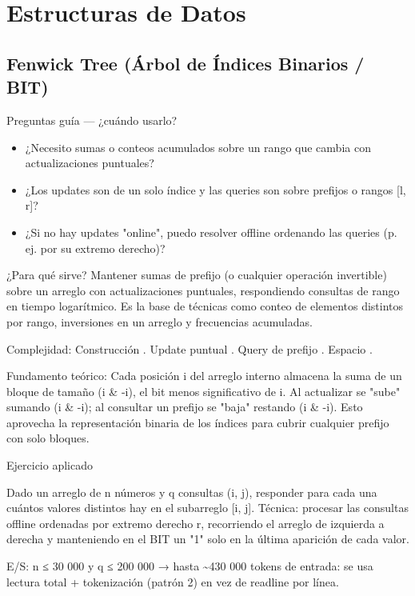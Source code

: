 \section{Estructuras de Datos}

\subsection{Fenwick Tree (Árbol de Índices Binarios / BIT)}

Preguntas guía — ¿cuándo usarlo?

\begin{itemize}
\item ¿Necesito sumas o conteos acumulados sobre un rango que cambia con actualizaciones puntuales?
\item ¿Los updates son de un solo índice y las queries son sobre prefijos o rangos [l, r]?
\item ¿Si no hay updates "online", puedo resolver offline ordenando las queries (p. ej. por su extremo derecho)?
\end{itemize}

¿Para qué sirve? Mantener sumas de prefijo (o cualquier operación invertible) sobre un arreglo con actualizaciones puntuales, respondiendo consultas de rango en tiempo logarítmico. Es la base de técnicas como conteo de elementos distintos por rango, inversiones en un arreglo y frecuencias acumuladas.

Complejidad: Construcción . Update puntual . Query de prefijo . Espacio .

Fundamento teórico: Cada posición i del arreglo interno almacena la suma de un bloque de tamaño (i \& -i), el bit menos significativo de i. Al actualizar se "sube" sumando (i \& -i); al consultar un prefijo se "baja" restando (i \& -i). Esto aprovecha la representación binaria de los índices para cubrir cualquier prefijo con solo  bloques.

Ejercicio aplicado

Dado un arreglo de n números y q consultas (i, j), responder para cada una cuántos valores distintos hay en el subarreglo [i, j]. Técnica: procesar las consultas offline ordenadas por extremo derecho r, recorriendo el arreglo de izquierda a derecha y manteniendo en el BIT un "1" solo en la última aparición de cada valor.

E/S: n ≤ 30 000 y q ≤ 200 000 → hasta \textasciitilde{}430 000 tokens de entrada: se usa lectura total + tokenización (patrón 2) en vez de readline por línea.

